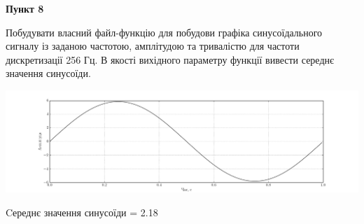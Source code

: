 \documentclass[a4paper,12pt]{article}
\begin{document}
\begin{center}
\textbf{Пункт 8}\par
\end{center}
 Побудувати власний файл-функцію для побудови графіка синусоїдального сигналу із заданою частотою, амплітудою та тривалістю для частоти дискретизації 256 Гц. В якості вихідного параметру функції вивести середнє значення синусоїди. \par


\begin{center}
\includegraphics[height = 12 cm, width=18 cm]{8.png}\par
\vspace{1cm}
\end{center}
Cереднє значення синусоїди = 2.18
\end{document}
